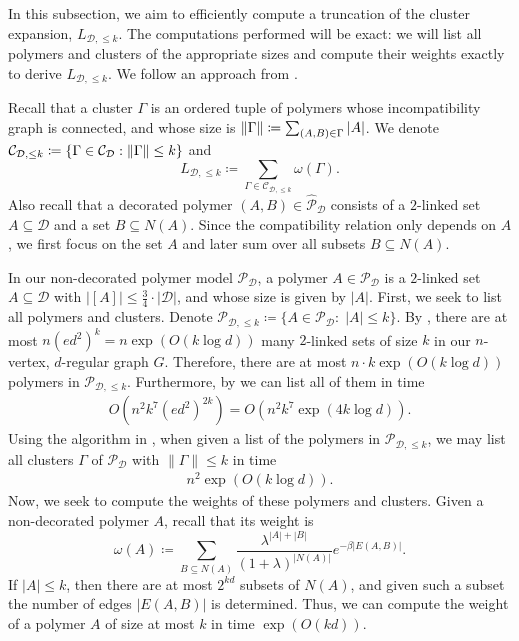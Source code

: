 \documentclass[reqno,a4paper,11pt]{amsart}
\newcommand{\cC}{\mathcal{C}}
\newcommand{\cD}{\mathcal{D}}
\newcommand{\cP}{\mathcal{P}}
\DeclarePairedDelimiter{\norm}{\lVert}{\rVert}
\begin{document}
In this subsection, we aim to efficiently compute a truncation of the cluster expansion, $L_{\cD, \leq k}$. The computations performed will be exact: we will list all polymers and clusters of the appropriate sizes and compute their weights exactly to derive $L_{\cD, \leq k}$. We follow an approach from \cite[Theorem 8]{JeKePe20}.

Recall that a cluster $\Gamma$ is an ordered tuple of polymers whose incompatibility graph is connected, and whose size is $\norm{\Gamma} \coloneqq \sum_{(A, B) \in \Gamma} |A|$. We denote $\mathcal{C}_{\cD, \leq k} \coloneqq \{\Gamma\in \cC_\cD: \norm{\Gamma} \leq k\}$ and
\[
L_{\cD, \leq k} \coloneqq \sum_{\Gamma \in \cC_{\cD, \leq k}} \omega(\Gamma).
\]
Also recall that a decorated polymer $(A, B) \in \hat{\cP}_{\cD}$ consists of a $2$-linked set $A \subseteq \cD$ and a set $B \subseteq N(A)$. Since the compatibility relation only depends on $A$, we first focus on the set $A$ and later sum over all subsets $B \subseteq N(A)$. 

In our non-decorated polymer model $\cP_{\cD}$, a polymer $A \in \cP_{\cD}$ is a $2$-linked set $A \subseteq \cD$ with $|[A]| \leq \frac{3}{4} \cdot |\cD|$, and whose size is given by $|A|$. First, we seek to list all polymers and clusters. Denote $\cP_{\cD, \leq k} \coloneqq \{A \in \cP_{\cD}: \; |A|\leq k\}$. By , there are at most $n(ed^2)^k = n \exp(O(k \log d))$ many $2$-linked sets of size $k$ in our $n$-vertex, $d$-regular graph $G$. Therefore, there are at most
$n\cdot k \exp(O(k \log d))$ polymers in $\cP_{\cD, \leq k}$. Furthermore, by \cite[Lemma 3.4]{PaRe17} we can list all of them in time 
\begin{align} \label{eq:list_polymers}
    O(n^2 k^7 (ed^2)^{2k})= O(n^2 k^7 \exp(4k \log d)).
\end{align}
Using the algorithm in \cite[Proof of Theorem 6]{HePeRe20}, when given a list of the polymers in $\cP_{\cD, \leq k}$, we may list all clusters $\Gamma$ of $\cP_{\cD}$ with $\lVert \Gamma \rVert \leq k$ in time
\begin{align} \label{eq:list_clusters}
    n^2 \exp\left(O(k \log d)\right).
\end{align}
Now, we seek to compute the weights of these polymers and clusters. Given a non-decorated polymer $A$, recall that its weight is
\[
\omega(A) \coloneqq \sum_{B \subseteq N(A)} \frac{\lambda^{|A|+|B|}}{(1+\lambda)^{|N(A)|}} e^{-\beta |E(A, B)|}.
\]
If $|A| \le k$, then there are at most $2^{kd}$ subsets of $N(A)$, and given such a subset the number of edges $|E(A, B)|$ is determined. Thus, we can compute the weight of a polymer $A$ of size at most $k$ in time $\exp(O(kd))$.
\end{document}
